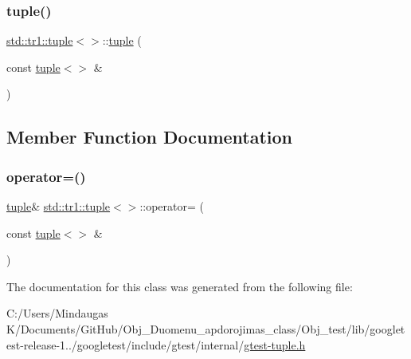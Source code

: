 \mbox{\label{classstd_1_1tr1_1_1tuple_3_4_aa857599acb126134e29dc5e53fd9d1a7}} 
\subsubsection{\texorpdfstring{tuple()}{tuple()}\hspace{0.1cm}{\footnotesize\ttfamily [2/2]}}
{\footnotesize\ttfamily \mbox{\hyperlink{classstd_1_1tr1_1_1tuple}{std\+::tr1\+::tuple}}$<$$>$\+::\mbox{\hyperlink{classstd_1_1tr1_1_1tuple}{tuple}} (\begin{DoxyParamCaption}\item[{const \mbox{\hyperlink{classstd_1_1tr1_1_1tuple}{tuple}}$<$$>$ \&}]{ }\end{DoxyParamCaption})\hspace{0.3cm}{\ttfamily [inline]}}



\subsection{Member Function Documentation}
\mbox{\label{classstd_1_1tr1_1_1tuple_3_4_a93ddab6f662662fc49635608619150c8}} 
\subsubsection{\texorpdfstring{operator=()}{operator=()}}
{\footnotesize\ttfamily \mbox{\hyperlink{classstd_1_1tr1_1_1tuple}{tuple}}\& \mbox{\hyperlink{classstd_1_1tr1_1_1tuple}{std\+::tr1\+::tuple}}$<$$>$\+::operator= (\begin{DoxyParamCaption}\item[{const \mbox{\hyperlink{classstd_1_1tr1_1_1tuple}{tuple}}$<$$>$ \&}]{ }\end{DoxyParamCaption})\hspace{0.3cm}{\ttfamily [inline]}}



The documentation for this class was generated from the following file\+:\begin{DoxyCompactItemize}
\item 
C\+:/\+Users/\+Mindaugas K/\+Documents/\+Git\+Hub/\+Obj\+\_\+\+Duomenu\+\_\+apdorojimas\+\_\+class/\+Obj\+\_\+test/lib/googletest-\/release-\/1../googletest/include/gtest/internal/\mbox{\hyperlink{gtest-tuple_8h}{gtest-\/tuple.\+h}}\end{DoxyCompactItemize}
